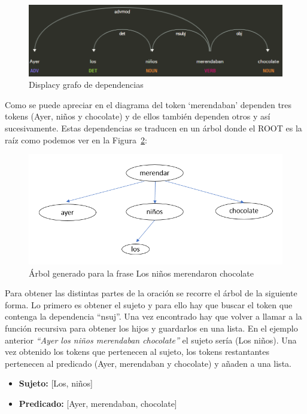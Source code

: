 \begin{figure}[h]
	\centering
	\includegraphics[width=1\textwidth]{Imagenes/Fuentes/Text2LSE/dependencias.png}
	\caption{ Displacy grafo de dependencias }
	\label {fig: dependencias}
\end{figure}


Como se puede apreciar en el diagrama del token `merendaban' dependen tres tokens (Ayer, niños y chocolate) y de ellos también dependen otros y así sucesivamente. Estas dependencias se traducen en un árbol donde el ROOT es la raíz como podemos ver en la Figura~\ref {fig: grafo}:\\


\begin{figure}[]
	\centering
	\includegraphics[width=1\textwidth]{Imagenes/Fuentes/Text2LSE/grafo.png}
	\caption{ Árbol generado para la frase Los niños merendaron chocolate }
	\label {fig: grafo}
\end{figure}


Para obtener las distintas partes de la oración se recorre el árbol de la siguiente forma. Lo primero es obtener el sujeto y para ello hay que buscar el token que contenga la dependencia ``nsuj''. Una vez encontrado hay que volver a llamar a la función recursiva para obtener los hijos y guardarlos en una lista. En el ejemplo anterior \textit{``Ayer los niños merendaban chocolate''} el sujeto sería (Los niños). Una vez obtenido los tokens que pertenecen al sujeto, los tokens restantantes pertenecen al predicado (Ayer, merendaban y chocolate) y añaden a una lista.
\begin{center}
	\begin{itemize}
		\item \textbf{Sujeto:}  [Los, niños]
		\item \textbf{Predicado:} [Ayer, merendaban, chocolate]
		
	\end{itemize}
\end{center}
